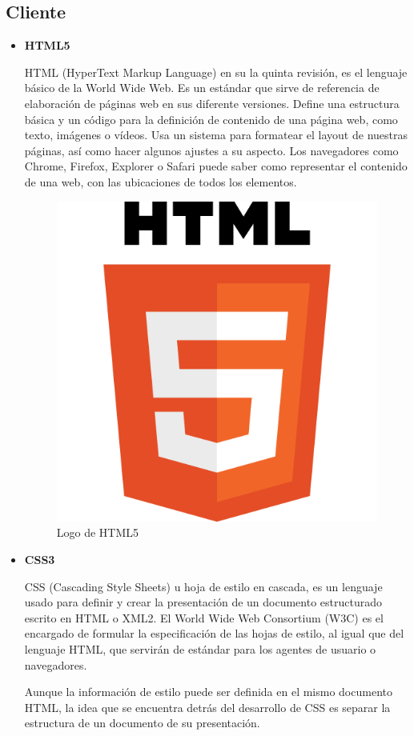 \newpage
\subsection{Cliente}
\bigskip


\begin{itemize}
	\item \textbf{HTML5}
	
	HTML (HyperText Markup Language) \cite{html} en su la quinta revisión, es el lenguaje básico de la World Wide Web. Es un estándar que sirve de referencia de elaboración de páginas web en sus diferente versiones. Define una estructura básica y un código para la definición de contenido de una página web, como texto, imágenes o vídeos. Usa un sistema para formatear el layout de nuestras páginas, así como hacer algunos ajustes a su aspecto. Los navegadores como Chrome, Firefox, Explorer o Safari puede saber como representar el contenido de una web, con las ubicaciones de todos los elementos.
	
	
	\bigskip
	\begin{figure}[h]
		\centering
		\includegraphics[width=0.3\linewidth]{../images/htmllogo}
		\caption[Logo de HTML5]{Logo de HTML5}
		\label{fig:htmllogo}
	\end{figure}
	
	\item \textbf{CSS3}
		
	 CSS (Cascading Style Sheets) \cite{css} u hoja de estilo en cascada, es un lenguaje usado para definir y crear la presentación de un documento estructurado escrito en HTML o XML2. El World Wide Web Consortium (W3C) es el encargado de formular la especificación de las hojas de estilo, al igual que del lenguaje HTML, que servirán de estándar para los agentes de usuario o navegadores.

	 Aunque la información de estilo puede ser definida en el mismo documento HTML, la idea que se encuentra detrás del desarrollo de CSS es separar la estructura de un documento de su presentación. 


\end{itemize}
